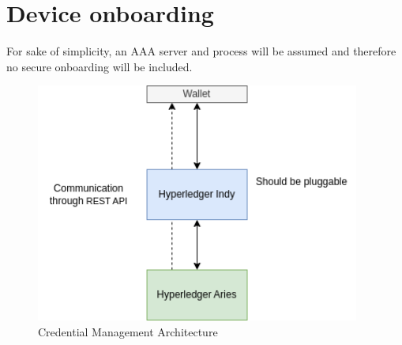
\section{Device onboarding} %
\label{sec:Device onboarding}

For sake of simplicity, an AAA server and process will be assumed and therefore no secure onboarding will be included.

\begin{figure}
	\begin{center}
		\includegraphics[width=0.95\textwidth]{figures/credential-architecture.png}
	\end{center}
	\caption{Credential Management Architecture}
	\label{fig:credential-architecture}
\end{figure}

